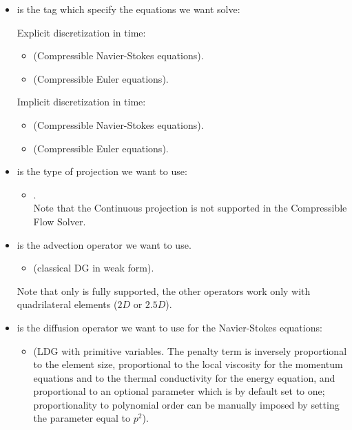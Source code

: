\begin{itemize}
  \item {} is the tag which specify the equations we want solve:

    Explicit discretization in time:
    \begin{itemize}
      \item {} (Compressible Navier-Stokes equations).
      \item {} (Compressible Euler equations).
    \end{itemize}

    Implicit discretization in time:
    \begin{itemize}
      \item {} (Compressible Navier-Stokes equations).
      \item {} (Compressible Euler equations).
    \end{itemize}
  \item {} is the type of projection we want to use:
    \begin{itemize}
      \item {}.\\
        Note that the Continuous projection is not supported in the Compressible Flow Solver.
    \end{itemize}
  \item {} is the advection operator we want to use.
    \begin{itemize}
      \item {} (classical DG in weak form).
    \end{itemize}
    Note that only  is fully supported, the other operators work
    only with quadrilateral elements ($2D$ or $2.5D$).
  \item {} is the diffusion operator we want to use
    for the Navier-Stokes equations:
    \begin{itemize}
      \item {} (LDG with primitive variables. The penalty term is inversely
      proportional to the element size, proportional to the local viscosity for the
      momentum equations and to the thermal conductivity for the energy equation,
      and proportional to an optional parameter  which is by default
      set to one; proportionality to polynomial order can be manually imposed by setting
      the parameter  equal to $p^2$).

\end{itemize}
\end{itemize}
